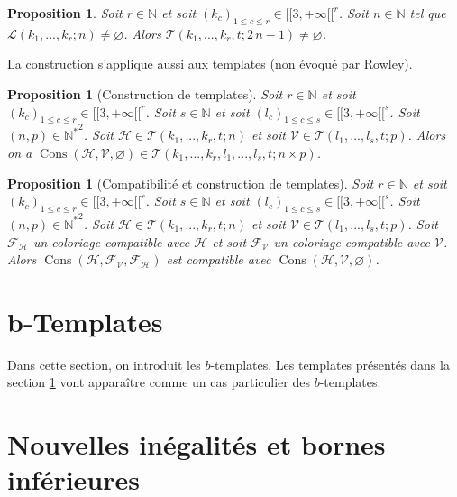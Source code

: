 \documentclass{article}
\newtheorem{proposition}[definition]{Proposition}
\DeclareMathOperator{\cons}{Cons}
\begin{document}
\begin{proposition}
Soit \(r \in \mathbb{N}\) et soit \((k_c)_{1 \leqslant c \leqslant r} \in {[\![3, +\infty[\![}^r\). Soit \(n \in \mathbb{N}\) tel que \(\mathcal{L}(k_1, ..., k_r; n) \neq \varnothing\). Alors \(\mathcal{T}(k_1, ..., k_r, t; 2 \, n - 1) \neq \varnothing\).
\end{proposition}

La construction s'applique aussi aux templates (non évoqué par Rowley).

\begin{proposition}[Construction de templates]
Soit \(r \in \mathbb{N}\) et soit \((k_c)_{1 \leqslant c \leqslant r} \in {[\![3, +\infty[\![}^r\). Soit \(s \in \mathbb{N}\) et soit \((l_c)_{1 \leqslant c \leqslant s} \in {[\![3, +\infty[\![}^s\). Soit \((n, p) \in {\mathbb{N}^*}^2\). Soit \(\mathcal{H} \in \mathcal{T}(k_1, ..., k_r, t; n)\) et soit \(\mathcal{V} \in \mathcal{T}(l_1, ..., l_s, t; p)\). Alors on a \(\cons(\mathcal{H}, \mathcal{V}, \varnothing) \in \mathcal{T}(k_1, ..., k_r, l_1, ..., l_s, t; n \times p)\).
\end{proposition}

\begin{proposition}[Compatibilité et construction de templates]
Soit \(r \in \mathbb{N}\) et soit \((k_c)_{1 \leqslant c \leqslant r} \in {[\![3, +\infty[\![}^r\). Soit \(s \in \mathbb{N}\) et soit \((l_c)_{1 \leqslant c \leqslant s} \in {[\![3, +\infty[\![}^s\). Soit \((n, p) \in {\mathbb{N}^*}^2\). Soit \(\mathcal{H} \in \mathcal{T}(k_1, ..., k_r, t; n)\) et soit \(\mathcal{V} \in \mathcal{T}(l_1, ..., l_s, t; p)\). Soit \(\mathcal{F}_\mathcal{H}\) un coloriage compatible avec \(\mathcal{H}\) et  soit \(\mathcal{F}_\mathcal{V}\) un coloriage compatible avec \(\mathcal{V}\).
Alors  \(\cons(\mathcal{H}, \mathcal{F}_\mathcal{V}, \mathcal{F}_\mathcal{H})\) est compatible avec \(\cons(\mathcal{H}, \mathcal{V}, \varnothing)\).
\end{proposition}

\section{b-Templates}
\label{sec:b-temp}
Dans cette section, on introduit les \(b\)-templates. Les templates présentés dans la section \ref{sec:b-temp} vont apparaître comme un cas particulier des \(b\)-templates.

\section{Nouvelles inégalités et bornes inférieures}
\label{sec:results}
\end{document}
